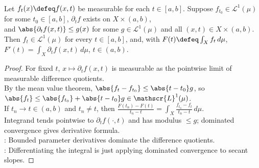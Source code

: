 \begin{theorem} \label{thm:differentiation-under-lebesgue-integral} \\
Let $f_t(x)\defeq f(x,t)$ be measurable for each $t\in[a,b]$. Suppose $f_{t_0}\in\mathscr{L}^1(\mu)$ for some $t_0\in[a,b]$, $\partial_tf$ exists on $X\times(a,b)$,\\
and $\abs{\partial_tf(x,t)}\leq g(x)$ for some $g\in\mathscr{L}^1(\mu)$ and all $(x,t)\in X\times(a,b)$.\\
Then $f_t\in\mathscr{L}^1(\mu)$ for every $t\in[a,b]$, and, with $F(t)\defeq\int_Xf_t\,d\mu$, $F'(t)=\int_X \partial_tf(x,t)\,d\mu$, $t\in(a,b)$.
\begin{proof}
For fixed $t$, $x\mapsto\partial_tf(x,t)$ is measurable as the pointwise limit of measurable difference quotients.\\
By the mean value theorem, $\abs{f_t-f_{t_0}}\leq \abs{t-t_0}g$, so $\abs{f_t}\leq\abs{f_{t_0}}+\abs{t-t_0}g\in\mathscr{L}^1(\mu)$.\\
If $t_n\to t\in(a,b)$ and $t_n\neq t$, then $\frac{F(t_n)-F(t)}{t_n-t} =\int_X\frac{f_{t_n}-f_t}{t_n-t}\,d\mu$.\\
Integrand tends pointwise to $\partial_tf(\cdot,t)$ and has modulus $\leq g$; dominated convergence gives derivative formula.\\
: Bounded parameter derivatives dominate the difference quotients.\\
: Differentiating the integral is just applying dominated convergence to secant slopes.
\end{proof}
\end{theorem}

